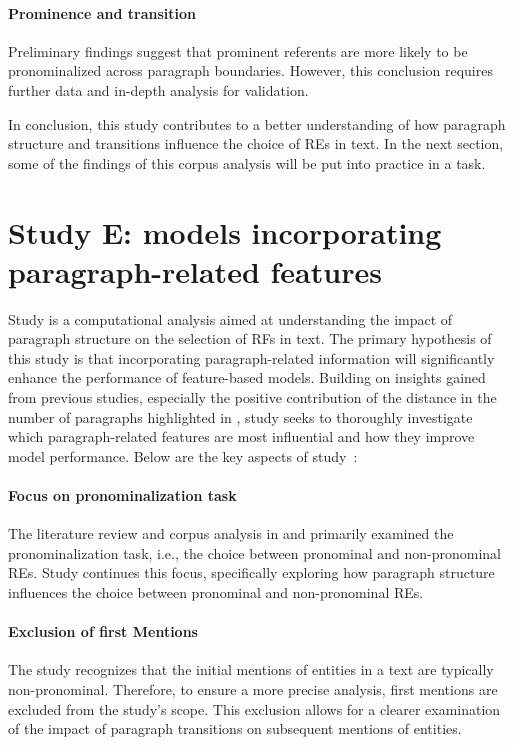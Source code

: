 \paragraph*{Prominence and transition} Preliminary findings suggest that prominent referents are more likely to be pronominalized across paragraph boundaries. However, this conclusion requires further data and in-depth analysis for validation.

In conclusion, this study contributes to a better understanding of how paragraph structure and transitions influence the choice of REs in text. In the next section, some of the findings of this corpus analysis will be put into practice in a \context task. 

\section{Study E: \context models incorporating paragraph-related features}\label{sec:mlstudy}

Study \studE is a computational analysis aimed at understanding the impact of paragraph structure on the selection of RFs in text. The primary hypothesis of this study is that incorporating paragraph-related information will significantly enhance the performance of feature-based \context models. Building on insights gained from previous studies, especially the positive contribution of the distance in the number of paragraphs highlighted in , study \studE seeks to thoroughly investigate which paragraph-related features are most influential and how they improve model performance. Below are the key aspects of study~\studE:

\paragraph*{Focus on pronominalization task} The literature review and corpus analysis in  and  primarily examined the pronominalization task, i.e., the choice between pronominal and non-pronominal REs. Study \studE continues this focus, specifically exploring how paragraph structure influences the choice between pronominal and non-pronominal REs.

\paragraph*{Exclusion of first Mentions} The study recognizes that the initial mentions of entities in a text are typically non-pronominal. Therefore, to ensure a more precise analysis, first mentions are excluded from the study's scope. This exclusion allows for a clearer examination of the impact of paragraph transitions on subsequent mentions of entities.

